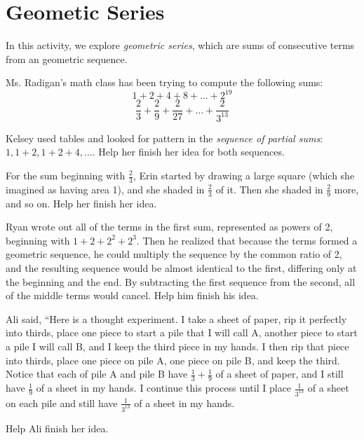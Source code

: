 \newpage
\section{Geometic Series}\label{A:geometicSeries}

In this activity, we explore \emph{geometric series}, which are sums of consecutive terms from an geometric sequence.

Ms. Radigan's math class has been trying to compute the following sums:  
$$1+2+4+8+\dots+2^{19}$$
$$\frac{2}{3}+\frac{2}{9}+\frac{2}{27}+\dots+\frac{2}{3^{13}}$$

\begin{prob}
Kelsey used tables and looked for pattern in the \emph{sequence of partial sums}:  $1, 1+2, 1+2+4, \dots$.  Help her finish her idea for both sequences.    
\end{prob}

\begin{prob}
For the sum beginning with $\frac{2}{3}$, Erin started by drawing a large square (which she imagined as having area 1), and she shaded in $\frac{2}{3}$ of it.  Then she shaded in $\frac{2}{9}$ more, and so on.  Help her finish her idea.  
\end{prob}

\begin{prob}
Ryan wrote out all of the terms in the first sum, represented as powers of 2, beginning with $1+2+2^2+2^3$.  
Then he realized that because the terms formed a geometric sequence, he could multiply the sequence by the common ratio of 2, and the resulting sequence would be almost identical to the first, differing only at the beginning and the end.  By subtracting the first sequence from the second, all of the middle terms would cancel.  Help him finish his idea.  
\end{prob}

\begin{prob}
Ali said, ``Here is a thought experiment.  I take a sheet of paper, rip it perfectly into thirds, place one piece to start a pile that I will call A, another piece to start a pile I will call B, and I keep the third piece in my hands.  I then rip that piece into thirds, place one piece on pile A, one piece on pile B, and keep the third.  Notice that each of pile A and pile B have $\frac{1}{3}+\frac{1}{9}$ of a sheet of paper, and I still have $\frac{1}{9}$ of a sheet in my hands.  I continue this process until I place $\frac{1}{3^{13}}$ of a sheet on each pile and still have $\frac{1}{3^{13}}$ of a sheet in my hands.  

Help Ali finish her idea.  
\end{prob}


